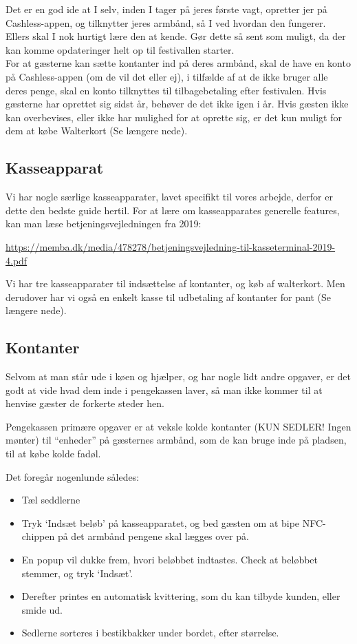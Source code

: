 Det er en god ide at I selv, inden I tager på jeres første vagt, opretter jer på
Cashless-appen, og tilknytter jeres armbånd, så I ved hvordan den fungerer. 
Ellers skal I nok hurtigt lære den at kende.
Gør dette så sent som muligt, da der kan komme opdateringer helt op til festivallen starter. \\

For at gæsterne kan sætte kontanter ind på deres armbånd, skal de have en konto på 
Cashless-appen (om de vil det eller ej), 
i tilfælde af at de ikke bruger alle deres penge, skal en konto tilknyttes til tilbagebetaling efter
festivalen. Hvis gæsterne har oprettet sig sidst år, behøver de det ikke igen i år.
Hvis gæsten ikke kan overbevises, eller ikke har mulighed for at oprette sig, er det kun muligt 
for dem at købe Walterkort (Se længere nede).

\subsection{Kasseapparat}
Vi har nogle særlige kasseapparater, lavet specifikt til vores arbejde, derfor er dette den bedste guide hertil. 
For at lære om kasseapparates generelle features, kan man læse betjeningsvejledningen fra 2019:
\begin{center}
  \small
  \href{https://memba.dk/media/478278/betjeningsvejledning-til-kasseterminal-2019-4.pdf}{https://memba.dk/media/478278/betjeningsvejledning-til-kasseterminal-2019-4.pdf}
\end{center}

Vi har tre kasseapparater til indsættelse af kontanter, og køb af walterkort. Men derudover har vi også en 
enkelt kasse til udbetaling af kontanter for pant (Se længere nede).

\subsection{Kontanter}

Selvom at man står ude i køen og hjælper, og har nogle lidt andre opgaver, 
er det godt at vide hvad dem inde i pengekassen laver, 
så man ikke kommer til at henvise gæster de forkerte steder hen.

Pengekassen primære opgaver er at veksle kolde kontanter (KUN SEDLER! Ingen mønter) til ``enheder'' på gæsternes armbånd, 
som de kan bruge inde på pladsen, til at købe kolde fadøl.

Det foregår nogenlunde således:
\begin{itemize}
  \item Tæl seddlerne
  \item Tryk `Indsæt beløb' på kasseapparatet, og bed gæsten om at bipe NFC-chippen på det armbånd pengene 
  skal lægges over på.
  \item En popup vil dukke frem, hvori beløbbet indtastes. 
  Check at beløbbet stemmer, og tryk `Indsæt'.
  \item Derefter printes en automatisk kvittering, som du kan tilbyde kunden, eller smide ud.
  \item Sedlerne sorteres i bestikbakker under bordet, efter størrelse.
\end{itemize}

